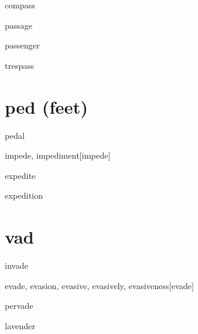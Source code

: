 \begin{RefWord}{compass}
\end{RefWord}

\begin{RefWord}{passage}
\end{RefWord}

\begin{RefWord}{passenger}
\end{RefWord}

\begin{RefWord}{trespass}
\end{RefWord}

\section{ped (feet)}

\begin{RefWord}{pedal}
\end{RefWord}

\begin{RefWord}{impede, impediment}[impede]
\end{RefWord}

\begin{RefWord}{expedite}
\end{RefWord}

\begin{RefWord}{expedition}
\end{RefWord}

\section{vad}

\begin{RefWord}{invade}
\end{RefWord}

\begin{RefWord}{evade, evasion, evasive, evasively, evasiveness}[evade]
\end{RefWord}

\begin{RefWord}{pervade}
\end{RefWord}

\begin{RefWord}{lavender}
\end{RefWord}